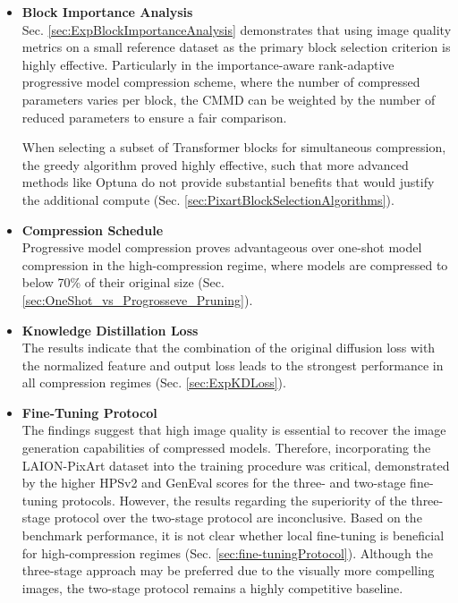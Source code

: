  \begin{itemize}
 	\item \textbf{Block Importance Analysis} \\
 	Sec. \ref{sec:ExpBlockImportanceAnalysis} demonstrates that using image quality metrics on a small reference dataset as the primary block selection criterion is highly effective. Particularly in the importance-aware rank-adaptive progressive model compression scheme, where the number of compressed parameters varies per block, the \gls{CMMD} can be weighted by the number of reduced parameters to ensure a fair comparison. 
 	
 	When selecting a subset of Transformer blocks for simultaneous compression, the greedy algorithm proved highly effective, such that more advanced methods like Optuna do not provide substantial benefits that would justify the additional compute (Sec. \ref{sec:PixartBlockSelectionAlgorithms}).
 	
 	\item \textbf{Compression Schedule} \\
 	Progressive model compression proves advantageous over one-shot model compression in the high-compression regime, where models are compressed to below 70\% of their original size (Sec. \ref{sec:OneShot_vs_Progrosseve_Pruning}).
 	
 	\item \textbf{Knowledge Distillation Loss} \\
 	The results indicate that the combination of the original diffusion loss with the normalized feature and output loss leads to the strongest performance in all compression regimes (Sec. \ref{sec:ExpKDLoss}). 
 	
 	\item \textbf{Fine-Tuning Protocol} \\
 	The findings suggest that high image quality is essential to recover the image generation capabilities of compressed models. Therefore, incorporating the LAION-PixArt dataset into the training procedure was critical, demonstrated by the higher HPSv2 and GenEval scores for the three- and two-stage fine-tuning protocols. However, the results regarding the superiority of the three-stage protocol over the two-stage protocol are inconclusive. Based on the benchmark performance, it is not clear whether local fine-tuning is beneficial for high-compression regimes (Sec. \ref{sec:fine-tuningProtocol}). Although the three-stage approach may be preferred due to the visually more compelling images, the two-stage protocol remains a highly competitive baseline.
 	

\end{itemize}
